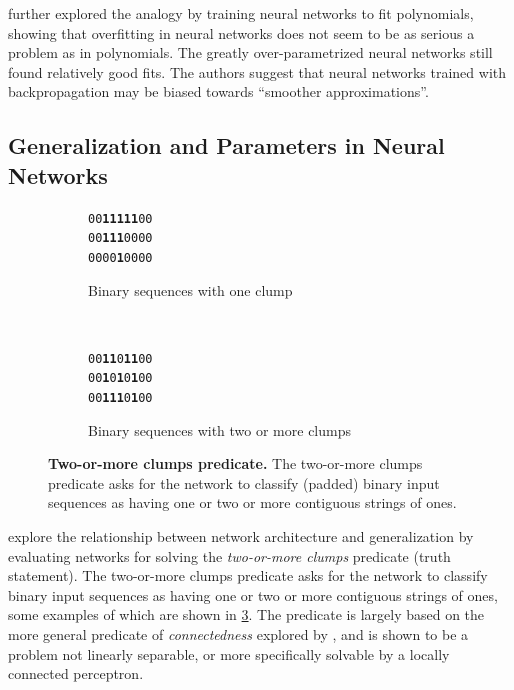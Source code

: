 \documentclass[thesis]{subfiles}
\begin{document}
    \citet{caruana2001overfitting} further explored the analogy by training neural networks to fit polynomials, showing that overfitting in neural networks does not seem to be as serious a problem as in polynomials. The greatly over-parametrized neural networks still found relatively good fits. The authors suggest that neural networks trained with backpropagation may be biased towards ``smoother approximations''.
	
	
	\subsection{Generalization and Parameters in Neural Networks}
	\begin{figure}[tb]
		\centering
		\large
        \renewcommand{\ttdefault}{pcr}
		\begin{subfigure}[t]{0.45\textwidth}
			\begin{center}
			\texttt{00\textbf{11111}00}\\
			\texttt{00\textbf{111}0000}\\
			\texttt{0000\textbf{1}0000}
			\end{center}
			\caption{Binary sequences with one clump}
			\label{fig:oneclump}
		\end{subfigure}
		~
		\begin{subfigure}[t]{0.45\textwidth}
			\begin{center}
			\texttt{00\textbf{11}0\textbf{11}00}\\
			\texttt{00\textbf{1}0\textbf{1}0\textbf{1}00}\\
			\texttt{00\textbf{111}0\textbf{1}00}
			\end{center}
			\caption{Binary sequences with two or more clumps}
			\label{fig:twoclumps}
		\end{subfigure}
		
		\caption[Two-or-more clumps predicate.]{\textbf{Two-or-more clumps predicate.} The two-or-more clumps predicate asks for the network to classify (padded) binary input sequences as having one or two or more contiguous strings of ones.}
		\label{fig:tomclumps}
	\end{figure}
	
	\citet{denker1987large,giles1987learning} explore the relationship between network architecture and generalization by evaluating networks for solving the \emph{two-or-more clumps} predicate (truth statement). The two-or-more clumps predicate asks for the network to classify binary input sequences as having one or two or more contiguous strings of ones, some examples of which are shown in \cref{fig:tomclumps}. The predicate is largely based on the more general predicate of \emph{connectedness} explored by \citet{minsky1988perceptrons}, and is shown to be a problem not linearly separable, or more specifically solvable by a locally connected perceptron. 
	
\end{document}
